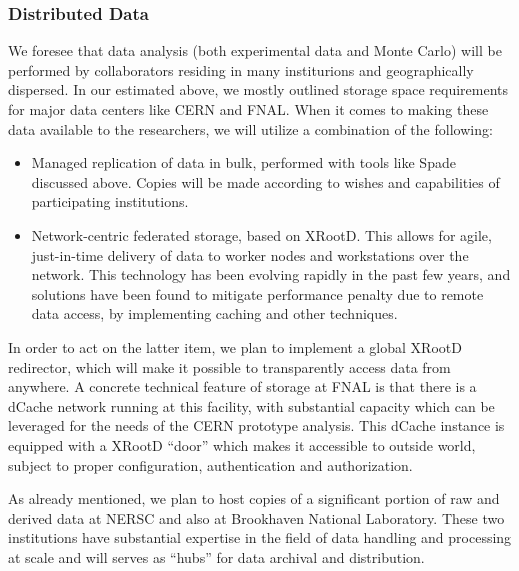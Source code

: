 \subsubsection{Distributed Data}
We foresee that data analysis (both experimental data and Monte Carlo) will be performed by collaborators residing in many institurions and geographically dispersed. In our
estimated above, we mostly outlined storage space requirements for major data centers like CERN and FNAL. When it comes to making these data available to the researchers,
we will utilize a combination of the following:
\begin{itemize}
\item Managed replication of data in bulk, performed with tools like Spade discussed above. Copies will be made according to wishes and capabilities of participating institutions.
\item Network-centric federated storage, based on XRootD. This allows for agile, just-in-time delivery of data to worker nodes and workstations over the network. This
technology has been evolving rapidly in the past few years, and solutions have been found to mitigate performance penalty due to remote data access, by implementing caching
and other techniques.
\end{itemize}

In order to act on the latter item, we plan to implement a global XRootD redirector, which will make it possible to transparently access data from anywhere.
A concrete technical feature of storage at FNAL is that there is a dCache network running at this facility, with substantial capacity which can be leveraged
for the needs of the CERN prototype analysis. This dCache instance is equipped with a XRootD ``door'' which makes it accessible to outside world, subject
to proper configuration, authentication and authorization.

As already mentioned, we plan to host copies of a significant portion of raw and derived data at NERSC and also at Brookhaven National Laboratory.
These two institutions have substantial expertise  in the field of data handling and processing at scale and will serves as ``hubs'' for data archival and
distribution.




%

